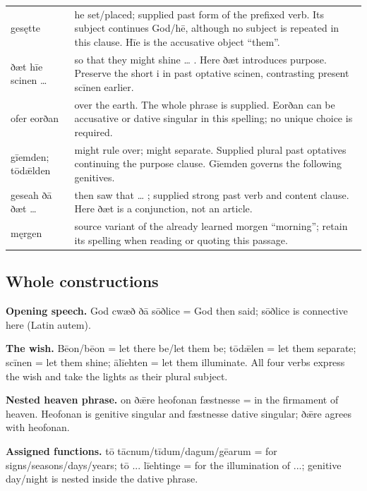 \begin{tabular}{@{}>{\raggedright\arraybackslash}p{29.38mm}>{\raggedright\arraybackslash}p{91.81mm}@{}}
gesętte & he set/\allowbreak{}placed; supplied past form of the prefixed verb. Its subject continues God/\allowbreak{}hē, although no subject is repeated in this clause. Hīe is the accusative object “them”. \\
ðæt hīe scinen … & so that they might shine … . Here ðæt introduces purpose. Preserve the short i in past optative scinen, contrasting present scīnen earlier. \\
ofer eorðan & over the earth. The whole phrase is supplied. Eorðan can be accusative or dative singular in this spelling; no unique choice is required. \\
gīemden; tōdǣlden & might rule over; might separate. Supplied plural past optatives continuing the purpose clause. Gīemden governs the following genitives. \\
geseah ðā ðæt … & then saw that … ; supplied strong past verb and content clause. Here ðæt is a conjunction, not an article. \\
męrgen & source variant of the already learned morgen “morning”; retain its spelling when reading or quoting this passage. \\
\bottomrule
\end{tabular}
\par\endgroup

\subsection*{Whole constructions}

\textbf{Opening speech.} God cwæð ðā sōðlice = God then said; sōðlice is connective here (Latin autem).

\textbf{The wish.} Bēon/\allowbreak{}bēon = let there be/\allowbreak{}let them be; tōdǣlen = let them separate; scīnen = let them shine; ālīehten = let them illuminate. All four verbs express the wish and take the lights as their plural subject.

\textbf{Nested heaven phrase.} on ðǣre heofonan fæstnesse = in the firmament of heaven. Heofonan is genitive singular and fæstnesse dative singular; ðǣre agrees with heofonan.

\textbf{Assigned functions.} tō tācnum/\allowbreak{}tīdum/\allowbreak{}dagum/\allowbreak{}gēarum = for signs/\allowbreak{}seasons/\allowbreak{}days/\allowbreak{}years; tō ... līehtinge = for the illumination of ...; genitive day/\allowbreak{}night is nested inside the dative phrase.

